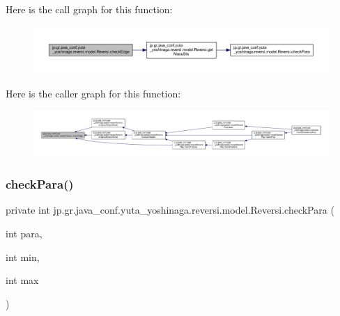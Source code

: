 Here is the call graph for this function\+:\nopagebreak
\begin{figure}[H]
\begin{center}
\leavevmode
\includegraphics[width=350pt]{classjp_1_1gr_1_1java__conf_1_1yuta__yoshinaga_1_1reversi_1_1model_1_1_reversi_a4874c6523adfdfd42dfbd625f5e3fe7a_cgraph}
\end{center}
\end{figure}
Here is the caller graph for this function\+:\nopagebreak
\begin{figure}[H]
\begin{center}
\leavevmode
\includegraphics[width=350pt]{classjp_1_1gr_1_1java__conf_1_1yuta__yoshinaga_1_1reversi_1_1model_1_1_reversi_a4874c6523adfdfd42dfbd625f5e3fe7a_icgraph}
\end{center}
\end{figure}
\mbox{\label{classjp_1_1gr_1_1java__conf_1_1yuta__yoshinaga_1_1reversi_1_1model_1_1_reversi_afbad8b2c3b2423a7490f9a3b636584d3}} 
\subsubsection{\texorpdfstring{check\+Para()}{checkPara()}}
{\footnotesize\ttfamily private int jp.\+gr.\+java\+\_\+conf.\+yuta\+\_\+yoshinaga.\+reversi.\+model.\+Reversi.\+check\+Para (\begin{DoxyParamCaption}\item[{int}]{para,  }\item[{int}]{min,  }\item[{int}]{max }\end{DoxyParamCaption})\hspace{0.3cm}{\ttfamily [private]}}



